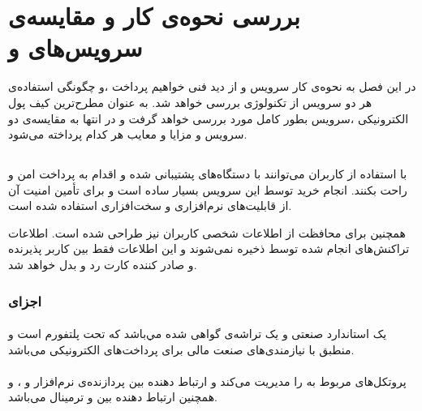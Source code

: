 \documentclass[oneside]{report}
\begin{document}
					
					
		\chapter{بررسی نحوه‌ی کار و مقایسه‌ی  سرویس‌های   {\Large{} }  و   {\Large{} }}\label{comparison}
		در این فصل به نحوه‌ی کار سرویس 
							{\normalsize {}} 
		و 
							{\normalsize {}}
	از دید فنی خواهیم پرداخت ،و چگونگی استفاده‌ی هر دو سرویس از تکنولوژی 
						{\normalsize {}} 
	بررسی خواهد شد. به عنوان مطرح‌ترین کیف پول الکترونیکی ،سرویس 
						{\normalsize {}}
 بطور کامل مورد بررسی خواهد گرفت و در انتها به مقایسه‌ی دو سرویس و مزایا و معایب هر کدام پرداخته می‌شود.
 
 \section{{\large{}} }
	 با استفاده از
	 						{\normalsize {}}
کاربران می‌توانند با  دستگاه‌های 
{\normalsize {}}
	پشتیبانی شده و 
	{\normalsize {}}
	اقدام به پرداخت امن و راحت بکنند. 
انجام خرید توسط این سرویس بسیار ساده است و برای تأمین امنیت آن از قابلیت‌های نرم‌افزاری و سخت‌افزاری استفاده شده است.

{\normalsize {}}
همچنین برای محافظت از اطلاعات شخصی کاربران نیز طراحی شده است. اطلاعات تراکنش‌های انجام شده توسط 
{\normalsize {}}
ذخیره نمی‌شوند و این اطلاعات فقط بین کاربر پذیرنده و صادر کننده کارت رد‌‌ و بدل خواهد شد.

\subsection{اجزای {\normalsize {}} }
 
 \subsubsection{{\small {}}}
 {\normalsize {}}
 یک استاندارد صنعتی و یک تراشه‌ی گواهی شده
 مي‌باشد که تحت پلتفورم 
 {\normalsize {}}
 است و منطبق با نیازمندی‌های صنعت مالی برای پرداخت‌های الکترونیکی می‌باشد.
 
  \subsubsection{{\small {}}}
  {\normalsize {}}
  پروتکل‌های مربوط به 
   {\normalsize {}}
   را مدیریت می‌کند و ارتباط دهنده بین پردازنده‌ی نرم‌افزار 
  و 
   {\normalsize {}}
   ، و همچنین ارتباط دهنده بین 
    {\normalsize {}}
    و ترمینال
     {\normalsize {}} 
      می‌باشد.
      
\end{document}
